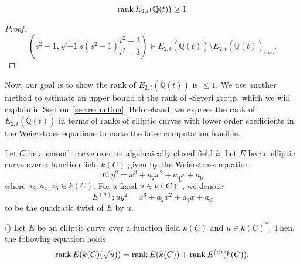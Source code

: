 \documentclass[main]{subfiles}
\begin{document}
\begin{lem}
    \begin{equation*}
        \operatorname{rank} E_{2,t}(\overline{\mathbb{Q}}(t)) \geq 1
    \end{equation*}
\end{lem}
\begin{proof}
    \begin{equation*}
        \left(s^{2} - 1, \sqrt{-1} s(s^{2} - 1) \frac{t^{2} + 3}{t^{2} - 3} \right) \in E_{2,t}(\overline{\mathbb{Q}}(t)) \setminus E_{2,t}(\overline{\mathbb{Q}}(t))_{\text{tors}}.
    \end{equation*}
\end{proof}
Now, our goal is to show the rank of $E_{2,t}(\overline{\mathbb{Q}}(t))$ is $\leq 1$.
We use another method to estimate an upper bound of the rank of \Neron-Severi group, which we will explain in Section~\ref{sec:reduction}.
Beforehand, we express the rank of $E_{2,t}(\overline{\mathbb{Q}}(t))$ in terms of ranks of elliptic curves with lower order coefficients in the Weierstrass equations to make the later computation feasible.

\begin{dfn}
    Let $C$ be a smooth curve over an algebraically closed field $k$.
    Let $E$ be an elliptic curve over a function field $k(C)$ given by the Weierstrass equation
    \begin{equation*}
        E: y^{2} = x^{3} + a_{2} x^{2} + a_{4} x + a_{6}
    \end{equation*}
    where $a_{2}, a_{4}, a_{6} \in k(C)$.
    For a fixed $u \in k(C)^*$, we denote
    \begin{equation*}
        E^{(u)}: u y^{2} = x^{3} + a_{2} x^{2} + a_{4} x + a_{6}
    \end{equation*}
    to be the quadratic twist of $E$ by $u$.
\end{dfn}

\begin{prop}{(\cite[Exercise 10.16]{ref:aec})}
    \label{prop:twist}
    Let $E$ be an elliptic curve over a function field $k(C)$ and $u \in k(C)^*$.
    Then, the following equation holds
    \begin{equation*}
        \operatorname{rank} E(k(C)(\sqrt{u})) = \operatorname{rank} E(k(C)) + \operatorname{rank} E^{(u)}(k(C)).
    \end{equation*}
\end{prop}
\end{document}
